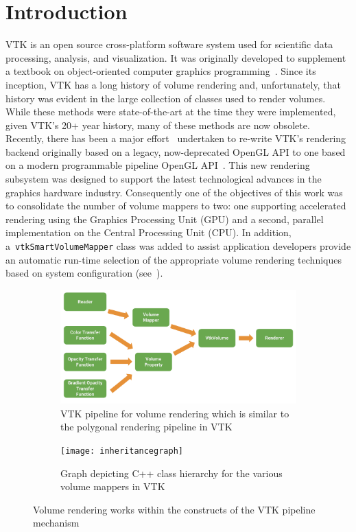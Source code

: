 \section{Introduction}
\label{introduction}
VTK is an open source cross-platform software system used for scientific data
processing, analysis, and visualization. It was originally developed to
supplement a textbook on object-oriented computer graphics
programming~\citep{schroeder_visualization_2006, geveci_vtk_2012}.  Since its
inception, VTK has a long history of volume rendering and, unfortunately, that
history was evident in the large collection of classes used to render volumes.
While these methods were state-of-the-art at the time they were implemented,
given VTK's 20+ year history, many of these methods are now obsolete. Recently,
there has been a major effort~\citep{hanwell_visualization_2015} undertaken to
re-write VTK's rendering backend originally based on a legacy, now-deprecated
OpenGL API to one based on a modern programmable pipeline OpenGL
API~\citep{shreiner_opengl_2013}. This new rendering subsystem was designed to
support the latest technological advances in the graphics hardware industry.
Consequently one of the objectives of this work was to consolidate the number of
volume mappers to two: one supporting accelerated rendering using the Graphics
Processing Unit (GPU) and a second, parallel implementation on the Central
Processing Unit (CPU). In addition, a~\texttt{vtkSmartVolumeMapper} class was
added to assist application developers  provide an automatic run-time selection of
the appropriate volume rendering techniques based on system configuration
(see~).

\begin{figure}
  \centering
  \begin{subfigure}[b]{\columnwidth}
    \centering
    \includegraphics[width=\columnwidth, height=0.4\textheight]{vtk_volume_pipeline}
    \caption{VTK pipeline for volume rendering which is similar to the polygonal
      rendering pipeline in VTK}
    \label{fig:pipeline}
  \end{subfigure}\vfill
  \begin{subfigure}[b]{\columnwidth}
    \centering
    \texttt{[image: inheritancegraph]}
    \caption{Graph depicting C++ class hierarchy for
      the various volume mappers in VTK}
    \label{fig:inheritancegraph}
  \end{subfigure}
  \caption{Volume rendering works within the constructs of the VTK pipeline
    mechanism}
  \label{fig:pipeline-inheritancegraph}
\end{figure}


